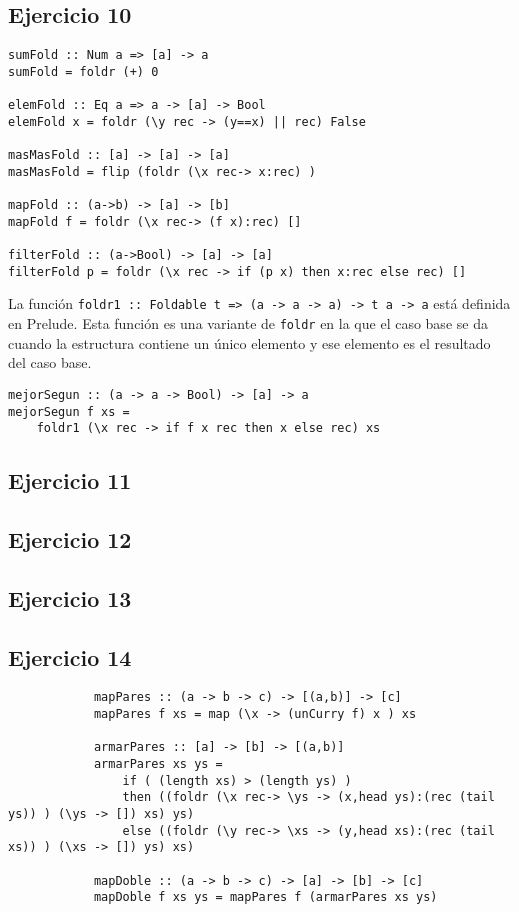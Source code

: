 \subsection{Ejercicio 10}
\begin{centrado}
	\begin{verbatim}
sumFold :: Num a => [a] -> a
sumFold = foldr (+) 0

elemFold :: Eq a => a -> [a] -> Bool
elemFold x = foldr (\y rec -> (y==x) || rec) False

masMasFold :: [a] -> [a] -> [a]
masMasFold = flip (foldr (\x rec-> x:rec) )

mapFold :: (a->b) -> [a] -> [b]
mapFold f = foldr (\x rec-> (f x):rec) []

filterFold :: (a->Bool) -> [a] -> [a]
filterFold p = foldr (\x rec -> if (p x) then x:rec else rec) []
	\end{verbatim}
\end{centrado}

La función \texttt{foldr1 :: Foldable t => (a -> a -> a) -> t a -> a} está definida en Prelude. Esta función es una variante de \texttt{foldr} en la que el caso base se da cuando la estructura contiene un único elemento y ese elemento es el resultado del caso base.

\begin{centrado}
	\begin{verbatim}
mejorSegun :: (a -> a -> Bool) -> [a] -> a
mejorSegun f xs = 
	foldr1 (\x rec -> if f x rec then x else rec) xs
	\end{verbatim}
\end{centrado}

\subsection{Ejercicio 11}
\subsection{Ejercicio 12}
\subsection{Ejercicio 13}
\subsection{Ejercicio 14}
	\begin{centrado}
		\begin{verbatim}
			mapPares :: (a -> b -> c) -> [(a,b)] -> [c]
			mapPares f xs = map (\x -> (unCurry f) x ) xs
			
			armarPares :: [a] -> [b] -> [(a,b)]
			armarPares xs ys = 
				if ( (length xs) > (length ys) )
				then ((foldr (\x rec-> \ys -> (x,head ys):(rec (tail ys)) ) (\ys -> []) xs) ys)
				else ((foldr (\y rec-> \xs -> (y,head xs):(rec (tail xs)) ) (\xs -> []) ys) xs)
			
			mapDoble :: (a -> b -> c) -> [a] -> [b] -> [c]
			mapDoble f xs ys = mapPares f (armarPares xs ys)
		\end{verbatim}
	\end{centrado}
	
